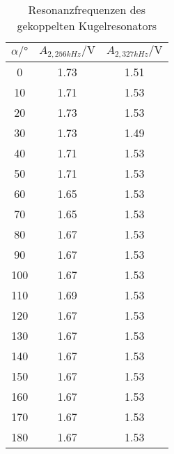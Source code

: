 \begin{table}
    \centering
    \caption{Resonanzfrequenzen des gekoppelten Kugelresonators}
    \label{tab:molekül}
    \begin{tabular}{c c c}
        \toprule
        $\alpha/°$ & $A_{2,256kHz}/\si{\volt}$ & $A_{2,327kHz}/\si{\volt}$\\
        \midrule
        0   &1.73    &1.51\\
        10  &1.71    &1.53\\
        20  &1.73    &1.53\\
        30  &1.73    &1.49\\
        40  &1.71    &1.53\\
        50  &1.71    &1.53\\
        60  &1.65    &1.53\\
        70  &1.65    &1.53\\
        80  &1.67    &1.53\\
        90  &1.67    &1.53\\
        100 &1.67    &1.53\\
        110 &1.69    &1.53\\
        120 &1.67    &1.53\\
        130 &1.67    &1.53\\
        140 &1.67    &1.53\\
        150 &1.67    &1.53\\
        160 &1.67    &1.53\\
        170 &1.67    &1.53\\
        180 &1.67    &1.53\\
        \bottomrule
    \end{tabular}
\end{table}

